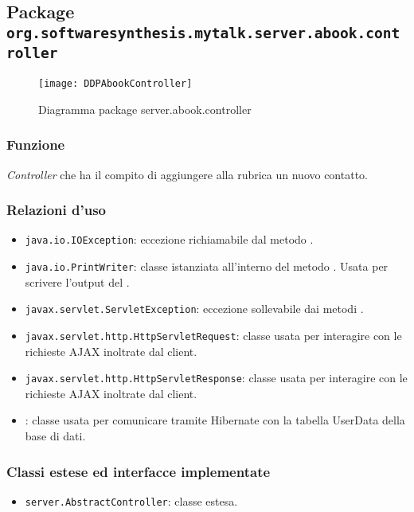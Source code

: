 \subsection{Package \texttt{org.softwaresynthesis.mytalk.server.abook.controller}}\label{sec:call}

\begin{center}
\begin{figure}[H]
  \texttt{[image: DDPAbookController]}
\caption{Diagramma package server.abook.controller}
\end{figure}
\end{center}



\subsubsection*{Funzione}
\textit{Controller} che ha il compito di aggiungere alla rubrica un nuovo contatto.

\subsubsection*{Relazioni d'uso}

\begin{itemize}
	\item \texttt{java.io.IOException}: eccezione richiamabile dal metodo .
	\item \texttt{java.io.PrintWriter}: classe istanziata all'interno del metodo . Usata per scrivere l'output del .
	\item \texttt{javax.servlet.ServletException}: eccezione sollevabile dai metodi .
	\item \texttt{javax.servlet.http.HttpServletRequest}: classe usata per interagire con le richieste AJAX inoltrate dal client.
	\item \texttt{javax.servlet.http.HttpServletResponse}: classe usata per interagire con le richieste AJAX inoltrate dal client.
	\item {}: classe usata per comunicare tramite Hibernate con la tabella UserData della base di dati.
\end{itemize}

\subsubsection*{Classi estese ed interfacce implementate}
\begin{itemize}
	\item \texttt{server.AbstractController}: classe estesa.
\end{itemize}


